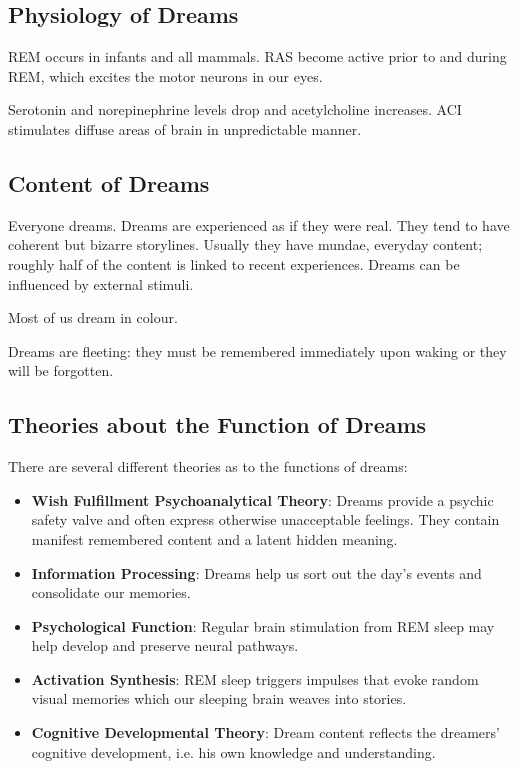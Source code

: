 \documentclass[12pt]{article}
\begin{document}
\subsection*{Physiology of Dreams}
REM occurs in infants and all mammals. RAS become active prior to and during REM, which excites the motor neurons in our eyes.

Serotonin and norepinephrine levels drop and acetylcholine increases. ACI stimulates diffuse areas of brain in unpredictable manner.

\subsection*{Content of Dreams}
Everyone dreams. Dreams are experienced as if they were real. They tend to have coherent but bizarre storylines. Usually they have mundae, everyday content; roughly half of the content is linked to recent experiences. Dreams can be influenced by external stimuli.

Most of us dream in colour.

Dreams are fleeting: they must be remembered immediately upon waking or they will be forgotten.

\subsection*{Theories about the Function of Dreams}
There are several different theories as to the functions of dreams:
\begin{itemize}
\item {\bf Wish Fulfillment Psychoanalytical Theory}: Dreams provide a psychic safety valve and often express otherwise unacceptable feelings. They contain manifest remembered content and a latent hidden meaning.
\item {\bf Information Processing}: Dreams help us sort out the day's events and consolidate our memories.
\item {\bf Psychological Function}: Regular brain stimulation from REM sleep may help develop and preserve neural pathways.
\item {\bf Activation Synthesis}: REM sleep triggers impulses that evoke random visual memories which our sleeping brain weaves into stories.
\item {\bf Cognitive Developmental Theory}: Dream content reflects the dreamers' cognitive development, i.e. his own knowledge and understanding.
\end{itemize}
\end{document}

